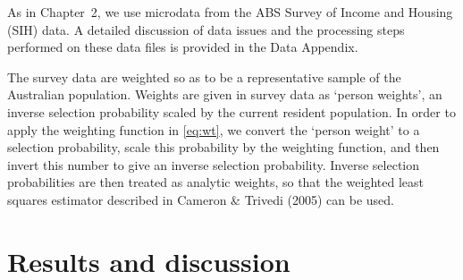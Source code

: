 As in Chapter~2, we use microdata from the ABS Survey of Income and Housing (SIH) data. A detailed discussion of data issues and the processing steps performed on these data files is provided in the Data Appendix.

The survey data are weighted so as to be a representative sample of the Australian population. Weights are given in survey data as `person weights', an inverse selection probability scaled by the current resident population. In order to apply the weighting function in \eqref{eq:wt}, we convert the `person weight' to a selection probability, scale this probability by the weighting function, and then invert this number to give an inverse selection probability. Inverse selection probabilities are then treated as analytic weights, so that the weighted least squares estimator described in Cameron \& Trivedi (2005) can be used.



\section{Results and discussion}

